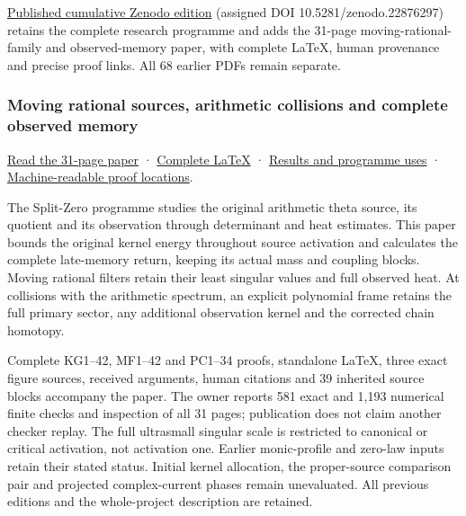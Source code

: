 \documentclass[
]{article}
\begin{document}
\href{https://zenodo.org/records/22876297}{Published cumulative Zenodo
edition} (assigned DOI 10.5281/zenodo.22876297) retains the complete
research programme and adds the 31-page moving-rational-family and
observed-memory paper, with complete LaTeX, human provenance and precise
proof links. All 68 earlier PDFs remain separate.

\subsubsection{Moving rational sources, arithmetic collisions and
complete observed
memory}\label{moving-rational-sources-arithmetic-collisions-and-complete-observed-memory}

\href{https://github.com/KokunoYumeto/zeta-function-research-reader/blob/main/workbenches/splitzero-tandem/continuations/20260921-moving-rational-family/MOVING_RATIONAL_FAMILY_COMPLETE_READER.pdf}{Read
the 31-page paper} ·
\href{https://github.com/KokunoYumeto/zeta-function-research-reader/blob/main/workbenches/splitzero-tandem/continuations/20260921-moving-rational-family/MOVING_RATIONAL_FAMILY_COMPLETE_READER.tex}{Complete
LaTeX} ·
\href{https://github.com/KokunoYumeto/zeta-function-research-reader/blob/main/workbenches/splitzero-tandem/continuations/20260921-moving-rational-family/RESULTS_20260921_017.md}{Results
and programme uses} ·
\href{https://github.com/KokunoYumeto/zeta-function-research-reader/blob/main/workbenches/splitzero-tandem/continuations/20260921-moving-rational-family/RESULT_INDEX.json}{Machine-readable
proof locations}.

The Split-Zero programme studies the original arithmetic theta source,
its quotient and its observation through determinant and heat estimates.
This paper bounds the original kernel energy throughout source
activation and calculates the complete late-memory return, keeping its
actual mass and coupling blocks. Moving rational filters retain their
least singular values and full observed heat. At collisions with the
arithmetic spectrum, an explicit polynomial frame retains the full
primary sector, any additional observation kernel and the corrected
chain homotopy.

Complete KG1--42, MF1--42 and PC1--34 proofs, standalone LaTeX, three
exact figure sources, received arguments, human citations and 39
inherited source blocks accompany the paper. The owner reports 581 exact
and 1,193 numerical finite checks and inspection of all 31 pages;
publication does not claim another checker replay. The full ultrasmall
singular scale is restricted to canonical or critical activation, not
activation one. Earlier monic-profile and zero-law inputs retain their
stated status. Initial kernel allocation, the proper-source comparison
pair and projected complex-current phases remain unevaluated. All
previous editions and the whole-project description are retained.
\end{document}

